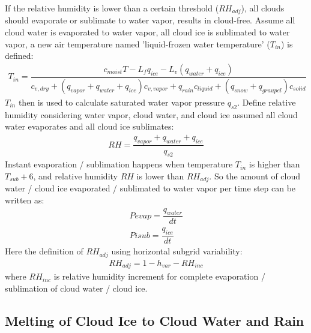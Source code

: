 \documentclass[letterpaper,titlepage,10pt]{article}
\numberwithin{equation}{section}
\begin{document}
If the relative humidity is lower than a certain threshold ($RH_{adj}$), all clouds should evaporate or sublimate to water vapor, results in cloud-free. Assume all cloud water is evaporated to water vapor, all cloud ice is sublimated to water vapor, a new air temperature named 'liquid-frozen water temperature' ($T_{in}$) is defined:
\begin{gather}
	T_{in} = \dfrac{c_{moist} T - L_f q_{ice} - L_v \left(q_{water} + q_{ice} \right)}{c_{v,dry} + \left(q_{vapor} + q_{water} + q_{ice} \right) c_{v,vapor} + q_{rain} c_{liquid} + \left(q_{snow} + q_{graupel} \right) c_{solid}}
\end{gather}
$T_{in}$ then is used to calculate saturated water vapor pressure $q_{s2}$. Define relative humidity considering water vapor, cloud water, and cloud ice assumed all cloud water evaporates and all cloud ice sublimates:
\begin{gather}
	RH = \dfrac{q_{vapor} + q_{water} + q_{ice}}{q_{s2}}
\end{gather}
Instant evaporation / sublimation happens when temperature $T_{in}$ is higher than $T_{sub} + 6$, and relative humidity $RH$ is lower than $RH_{adj}$. So the amount of cloud water / cloud ice evaporated / sublimated to water vapor per time step can be written as:
\begin{gather}
	Pevap = \dfrac{q_{water}}{dt} \\
	Pisub = \dfrac{q_{ice}}{dt}
\end{gather}
Here the definition of $RH_{adj}$ using horizontal subgrid variability:
\begin{gather}
	RH_{adj} = 1 - h_{var} - RH_{inc}
\end{gather}
where $RH_{inc}$ is relative humidity increment for complete evaporation / sublimation of cloud water / cloud ice.


\subsection{Melting of Cloud Ice to Cloud Water and Rain}
\end{document}
